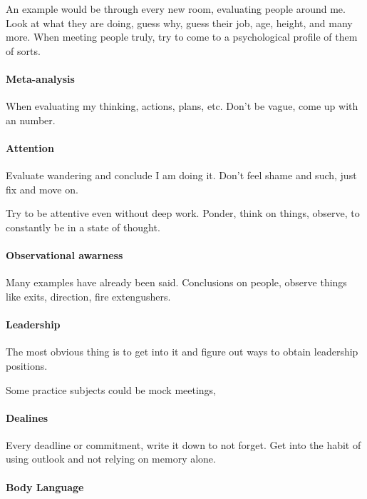 An example would be through every new room, evaluating people around me. Look at what they are doing, guess why, guess their job, age, height, and many more. When meeting people truly, try to come to a psychological profile of them of sorts.

\paragraph{Meta-analysis}

When evaluating my thinking, actions, plans, etc. Don't be vague, come up with an number.

\paragraph{Attention}

Evaluate wandering and conclude I am doing it. Don't feel shame and such, just fix and move on.

Try to be attentive even without deep work. Ponder, think on things, observe, to constantly be in a state of thought.

\paragraph{Observational awarness}

Many examples have already been said. Conclusions on people, observe things like exits, direction, fire extengushers.

\paragraph{Leadership}

The most obvious thing is to get into it and figure out ways to obtain leadership positions.

Some practice subjects could be mock meetings,

\paragraph{Dealines}

Every deadline or commitment, write it down to not forget. Get into the habit of using outlook and not relying on memory alone.

\paragraph{Body Language}

